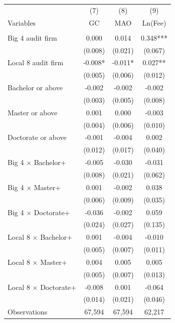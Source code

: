 \documentclass[10pt]{article}
\begin{document}
\begin{minipage}{19cm}\fontsize{10}{12}\selectfont\setlength{\tabcolsep}{4pt}\renewcommand{\arraystretch}{1.12}


\centering
{}
\begin{threeparttable}
\begin{tabular}{p{}ccc}
\toprule
 & (7) & (8) & (9) \\
Variables & GC & MAO & Ln(Fee) \\
\midrule
\addlinespace
\multicolumn{4}{l}{\textbf{Panel A: Cumulative degree thresholds (base: below bachelor)}} \\
Big 4 audit firm & 0.000 & 0.014 & 0.348*** \\
 & (0.008) & (0.021) & (0.067) \\
Local 8 audit firm & -0.008* & -0.011* & 0.027** \\
 & (0.005) & (0.006) & (0.012) \\
Bachelor or above & -0.002 & -0.002 & -0.002 \\
 & (0.003) & (0.005) & (0.008) \\
Master or above & 0.001 & 0.000 & -0.003 \\
 & (0.004) & (0.006) & (0.010) \\
Doctorate or above & -0.001 & -0.004 & 0.002 \\
 & (0.012) & (0.017) & (0.040) \\
Big 4 $\times$ Bachelor+ & -0.005 & -0.030 & -0.031 \\
 & (0.008) & (0.021) & (0.062) \\
Big 4 $\times$ Master+ & 0.001 & -0.002 & 0.038 \\
 & (0.006) & (0.009) & (0.035) \\
Big 4 $\times$ Doctorate+ & -0.036 & -0.002 & 0.059 \\
 & (0.024) & (0.027) & (0.135) \\
Local 8 $\times$ Bachelor+ & 0.001 & -0.004 & -0.010 \\
 & (0.005) & (0.007) & (0.011) \\
Local 8 $\times$ Master+ & 0.004 & 0.005 & 0.005 \\
 & (0.005) & (0.007) & (0.013) \\
Local 8 $\times$ Doctorate+ & -0.008 & 0.001 & -0.064 \\
 & (0.014) & (0.021) & (0.046) \\
Observations & 67,594 & 67,594 & 62,217 \\

\end{tabular}
\end{threeparttable}
\end{minipage}
\end{document}
